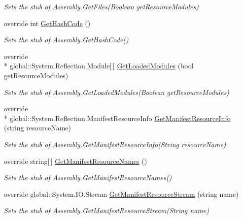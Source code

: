 \begin{DoxyCompactItemize}
\begin{DoxyCompactList}\small\item\em Sets the stub of Assembly.\-Get\-Files(\-Boolean get\-Resource\-Modules)\end{DoxyCompactList}\item 
override int \hyperlink{class_system_1_1_reflection_1_1_fakes_1_1_stub_assembly_ae71bc62a36b63bbf580dc61e8cddb051}{Get\-Hash\-Code} ()
\begin{DoxyCompactList}\small\item\em Sets the stub of Assembly.\-Get\-Hash\-Code()\end{DoxyCompactList}\item 
override \\*
global\-::\-System.\-Reflection.\-Module\mbox{[}$\,$\mbox{]} \hyperlink{class_system_1_1_reflection_1_1_fakes_1_1_stub_assembly_a859cc25be5b38a4c1483cfc58d9a623e}{Get\-Loaded\-Modules} (bool get\-Resource\-Modules)
\begin{DoxyCompactList}\small\item\em Sets the stub of Assembly.\-Get\-Loaded\-Modules(\-Boolean get\-Resource\-Modules)\end{DoxyCompactList}\item 
override \\*
global\-::\-System.\-Reflection.\-Manifest\-Resource\-Info \hyperlink{class_system_1_1_reflection_1_1_fakes_1_1_stub_assembly_af87c6e13a146abc7d299b04390ac77f1}{Get\-Manifest\-Resource\-Info} (string resource\-Name)
\begin{DoxyCompactList}\small\item\em Sets the stub of Assembly.\-Get\-Manifest\-Resource\-Info(\-String resource\-Name)\end{DoxyCompactList}\item 
override string\mbox{[}$\,$\mbox{]} \hyperlink{class_system_1_1_reflection_1_1_fakes_1_1_stub_assembly_a108084a535ed67f6adfd52edf02de405}{Get\-Manifest\-Resource\-Names} ()
\begin{DoxyCompactList}\small\item\em Sets the stub of Assembly.\-Get\-Manifest\-Resource\-Names()\end{DoxyCompactList}\item 
override global\-::\-System.\-I\-O.\-Stream \hyperlink{class_system_1_1_reflection_1_1_fakes_1_1_stub_assembly_a713e20f9c3dd44ab668a86152f6bd91b}{Get\-Manifest\-Resource\-Stream} (string name)
\begin{DoxyCompactList}\small\item\em Sets the stub of Assembly.\-Get\-Manifest\-Resource\-Stream(\-String name)\end{DoxyCompactList}\item 

\end{DoxyCompactItemize}
